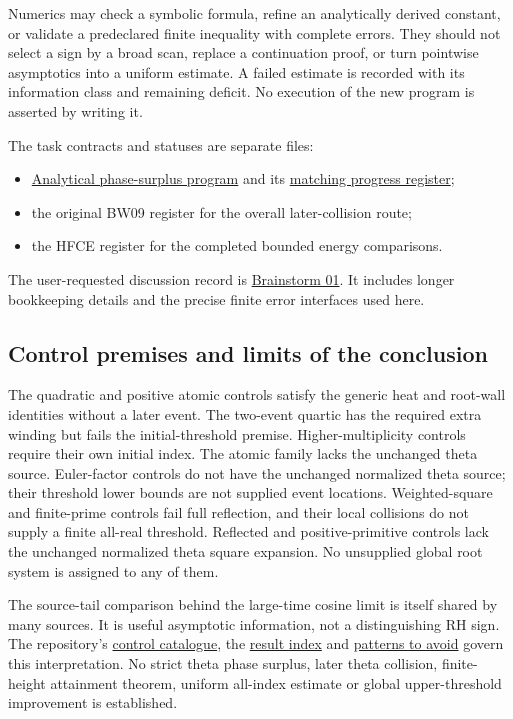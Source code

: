 \documentclass[11pt]{article}
\theoremstyle{definition}
\begin{document}
Numerics may check a symbolic formula, refine an analytically derived
constant, or validate a predeclared finite inequality with complete
errors. They should not select a sign by a broad scan, replace a
continuation proof, or turn pointwise asymptotics into a uniform estimate.
A failed estimate is recorded with its information class and remaining
deficit. No execution of the new program is asserted by writing it.

The task contracts and statuses are separate files:
\begin{itemize}
\item
\href{../research-overview/03_ANALYTICAL_PHASE_SURPLUS_PROGRAM_20261020.md}
{Analytical phase-surplus program} and its
\href{../research-progress/03_ANALYTICAL_PHASE_SURPLUS_PROGRESS_20261020.md}
{matching progress register};
\item the original BW09 register for the overall later-collision route;
\item the HFCE register for the completed bounded energy comparisons.
\end{itemize}
The user-requested discussion record is
\href{../brainstorm/01_CAP_AT_INFINITY_20261020.md}{Brainstorm 01}.
It includes longer bookkeeping details and the precise finite error
interfaces used here.

\subsection{Control premises and limits of the conclusion}
The quadratic and positive atomic controls satisfy the generic heat
and root-wall identities without a later event. The two-event quartic
has the required extra winding but fails the initial-threshold premise.
Higher-multiplicity controls require their own initial index.
The atomic family lacks the unchanged theta source. Euler-factor controls do not have the
unchanged normalized theta source; their threshold lower bounds are
not supplied event locations. Weighted-square and finite-prime controls
fail full reflection, and their local collisions do not supply a finite
all-real threshold. Reflected and positive-primitive controls lack the
unchanged normalized theta square expansion. No unsupplied global
root system is assigned to any of them.

The source-tail comparison behind the large-time cosine limit is itself
shared by many sources. It is useful asymptotic information, not a
distinguishing RH sign. The repository's
\href{../../../../../../../result-summaries/12_collision_controls_and_screening.md}
{control catalogue}, the
\href{../../../../../../../result-summaries/README.md}{result index}
and \href{../../../../../../../avoid/README.md}{patterns to avoid}
govern this interpretation.
No strict theta phase surplus, later theta collision, finite-height
attainment theorem, uniform all-index estimate or global upper-threshold
improvement is established.
\end{document}
